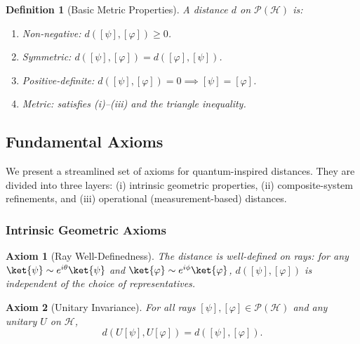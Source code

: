 \documentclass[aps,pra,reprint,nofootinbib,showpacs,superscriptaddress]{revtex4-1}
\newtheorem{definition}[theorem]{Definition}
\newtheorem{axiom}{Axiom}[section]
\newcommand{\Hilbert}{\mathcal{H}}
\newcommand{\Proj}{\mathcal{P}}
\begin{document}
\begin{definition}[Basic Metric Properties]
A distance $d$ on $\Proj(\Hilbert)$ is:
\begin{enumerate}[label=(\roman*)]
    \item \emph{Non-negative:} $d([\psi],[\varphi]) \ge 0$.
    \item \emph{Symmetric:} $d([\psi],[\varphi]) = d([\varphi],[\psi])$.
    \item \emph{Positive-definite:} $d([\psi],[\varphi]) = 0 \implies [\psi] = [\varphi]$.
    \item \emph{Metric:} satisfies (i)--(iii) and the triangle inequality.
\end{enumerate}
\end{definition}

\subsection{Fundamental Axioms}\label{subsec:ax}

We present a streamlined set of axioms for quantum-inspired distances. 
They are divided into three layers: (i) intrinsic geometric properties, 
(ii) composite-system refinements, and (iii) operational (measurement-based) distances.

\subsubsection{Intrinsic Geometric Axioms}

\begin{axiom}[Ray Well-Definedness]
\label{ax:ray}
The distance is well-defined on rays: for any $\ket{\psi} \sim e^{i\theta}\ket{\psi}$ and $\ket{\varphi} \sim e^{i\phi}\ket{\varphi}$,
\(
d([\psi],[\varphi])\) is independent of the choice of representatives.
\end{axiom}

\begin{axiom}[Unitary Invariance]
\label{ax:unitary_invariance}
For all rays $[\psi],[\varphi] \in \Proj(\Hilbert)$ and any unitary $U$ on $\Hilbert$,
\[
d(U[\psi],U[\varphi]) = d([\psi],[\varphi]).
\]
\end{axiom}
\end{document}

